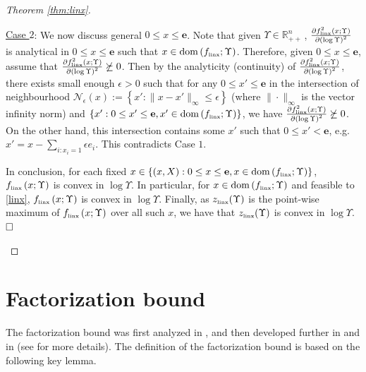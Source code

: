 \documentclass[smallextended]{svjour3hack}       %
\DeclareMathOperator{\dom}{dom}
\begin{document}
\begin{proof}[Theorem \ref{thm:linx}]
\begin{itemize}
    \smallskip
    \underline{Case $2$}: We now discuss general $0\le x \le \mathbf{e}$. Note that given $\Upsilon \in \mathbb{R}^n_{++}$\,, $\frac{\partial f^2_{{\tiny\mbox{linx}}}\left(x;\Upsilon\right)}{\partial \left(\log \Upsilon\right)^2}$ is analytical in $0\le x \le \mathbf{e}$ such that $x \in \dom\left(f_{{\tiny\mbox{linx}}};\Upsilon\right)$. Therefore, given $0\le x \le \mathbf{e}$, assume that $\frac{\partial f^2_{{\tiny\mbox{linx}}}\left(x;\Upsilon\right)}{\partial \left(\log \Upsilon\right)^2}\not\succeq 0$. Then by the analyticity (continuity) of $\frac{\partial f^2_{{\tiny\mbox{linx}}}\left(x;\Upsilon\right)}{\partial \left(\log \Upsilon\right)^2}$, there exists small enough $\epsilon>0$ such that for any $0\le x' \le \mathbf{e}$ in the intersection of neighbourhood $\mathcal{N}_\epsilon(x):= \left\{x': \|x-x'\|_{\infty}\le \epsilon\right\}$ (where $\|\cdot \|_{\infty}$ is the vector infinity norm) and $\{x': 0\le x' \le \mathbf{e}, x'\in \dom\left(f_{{\tiny\mbox{linx}}};\Upsilon\right)\}$, we have $\frac{\partial f^2_{{\tiny\mbox{linx}}}\left(x;\Upsilon\right)}{\partial \left(\log \Upsilon\right)^2}\not \succeq 0$. On the other hand, this intersection contains some $x'$ such that $0\le x'<\mathbf{e}$, e.g. $x'=x-\sum_{i:x_i=1} \epsilon e_i$. This contradicts Case $1$.
    \smallskip

   In conclusion, for each fixed $x\in \{(x,X): 0\le x \le \mathbf{e}, x \in \dom\left(f_{{\tiny\mbox{linx}}};\Upsilon\right)\}$, $f_{{\tiny\mbox{linx}}}\left(x;\Upsilon\right)$ is convex in $\log \Upsilon$. In particular, for $x\in \dom\left(f_{{\tiny\mbox{linx}}};\Upsilon\right)$ and feasible to \ref{linx}, $f_{{\tiny\mbox{linx}}}\left(x;\Upsilon\right)$ is convex in $\log \Upsilon$.
    Finally, as $z_{{\tiny\mbox{linx}}}(\Upsilon)$ is the point-wise maximum of $f_{{\tiny\mbox{linx}}}\left(x;\Upsilon\right)$ over all such $x$, we have that  $z_{{\tiny\mbox{linx}}}(\Upsilon)$ is convex in $\log \Upsilon$. $\hfill \square$

\end{itemize}
\end{proof}

\section{Factorization bound}\label{sec:fact}

The factorization bound was first analyzed in \cite{nikolov2015randomized},
and then developed further in \cite{li2020best} and in \cite{chen2023computing} (see \cite[Section 3.4]{FLbook} for more details). The definition of the factorization bound is based on the following key lemma.
\end{document}
